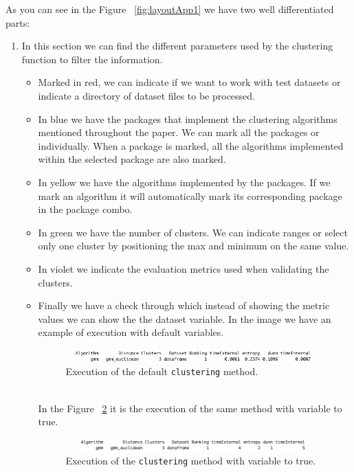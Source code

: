 As you can see in the Figure ~\ref{fig:layoutApp1} we have two well differentiated parts:
\begin{enumerate}
  \item In this section we can find the different parameters used by the clustering function to filter the information.
  \begin{itemize}
  \item Marked in red, we can indicate if we want to work with test datasets or indicate a directory of dataset files to be processed.
  \item In blue we have the packages that implement the clustering algorithms mentioned throughout the paper. We can mark all the packages or individually. When a package is marked, all the algorithms implemented within the selected package are also marked.
  \item In yellow we have the algorithms implemented by the packages. If we mark an algorithm it will automatically mark its corresponding package in the package combo.
  \item In green we have the number of clusters. We can indicate ranges or select only one cluster by positioning the max and minimum on the same value.
  \item In violet we indicate the evaluation metrics used when validating the clusters.
  \item Finally we have a check through which instead of showing the metric values we can show the the dataset variable. In the image we have an example of execution with default variables.
\begin{figure}[htbp]
  \centering
   \includegraphics[width=14cm,height=0.5cm]{img/variable_false}
    \caption{Execution of the default \texttt{clustering} method.}
    \label{fig:variable_false}%
\end{figure}
\\
In the Figure ~\ref{fig:variable_true} it is the execution of the same method with variable to true.
\begin{figure}[htbp]
  \centering
   \includegraphics[width=14cm, height=0.5cm]{img/variable_true}
    \caption{Execution of the \texttt{clustering} method with variable to true.}
    \label{fig:variable_true}%
\end{figure}
\\

\end{itemize}
\end{enumerate}
